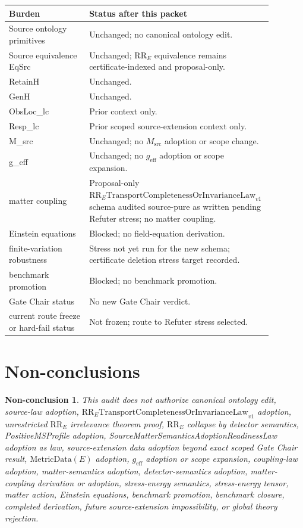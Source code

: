 \documentclass[11pt]{article}
\newcommand{\RRE}{\mathrm{RR}_{E}}
\newcommand{\LawRR}{\mathrm{RR}_{E}\mathrm{TransportCompletenessOrInvarianceLaw}_{v1}}
\newcommand{\MetricData}{\mathrm{MetricData}}
\newcommand{\geff}{g_{\mathrm{eff}}}
\newtheorem{nonconclusion}{Non-conclusion}
\begin{document}
\begin{longtable}{p{0.30\linewidth}p{0.58\linewidth}}
\toprule
Burden & Status after this packet \\
\midrule
Source ontology primitives & Unchanged; no canonical ontology edit. \\
Source equivalence EqSrc & Unchanged; \(\RRE\) equivalence remains certificate-indexed and proposal-only. \\
RetainH & Unchanged. \\
GenH & Unchanged. \\
ObsLoc\_lc & Prior context only. \\
Resp\_lc & Prior scoped source-extension context only. \\
M\_src & Unchanged; no \(M_{\mathrm{src}}\) adoption or scope change. \\
g\_eff & Unchanged; no \(\geff\) adoption or scope expansion. \\
matter coupling & Proposal-only \(\LawRR\) schema audited source-pure as written pending Refuter stress; no matter coupling. \\
Einstein equations & Blocked; no field-equation derivation. \\
finite-variation robustness & Stress not yet run for the new schema; certificate deletion stress target recorded. \\
benchmark promotion & Blocked; no benchmark promotion. \\
Gate Chair status & No new Gate Chair verdict. \\
current route freeze or hard-fail status & Not frozen; route to Refuter stress selected. \\
\bottomrule
\end{longtable}

\section{Non-conclusions}

\begin{nonconclusion}
This audit does not authorize canonical ontology edit, source-law adoption,
\(\LawRR\) adoption, unrestricted \(\RRE\) irrelevance theorem proof, \(\RRE\)
collapse by detector semantics, PositiveMSProfile adoption,
SourceMatterSemanticsAdoptionReadinessLaw adoption as law, source-extension
data adoption beyond exact scoped Gate Chair result, \(\MetricData(E)\)
adoption, \(\geff\) adoption or scope expansion, coupling-law adoption,
matter-semantics adoption, detector-semantics adoption, matter-coupling
derivation or adoption, stress-energy semantics, stress-energy tensor, matter
action, Einstein equations, benchmark promotion, benchmark closure, completed
derivation, future source-extension impossibility, or global theory rejection.
\end{nonconclusion}
\end{document}
